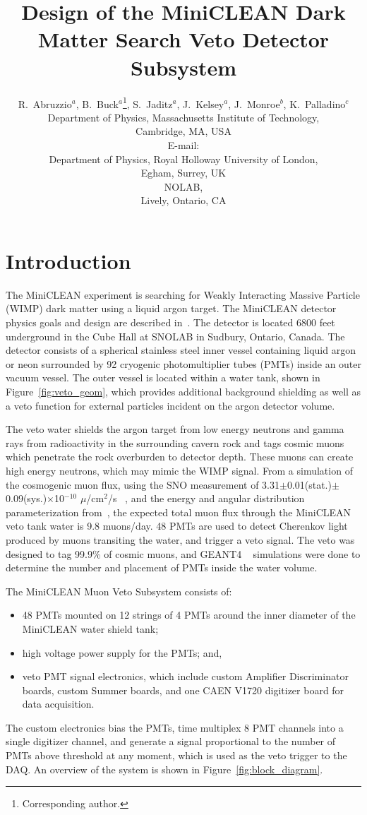 \documentclass{JINST}
\title{Design of the MiniCLEAN Dark Matter Search Veto Detector Subsystem}
\author{R.~Abruzzio$^a$, B.~Buck$^a$\thanks{Corresponding author.}, S.~Jaditz$^a$, J.~Kelsey$^a$, J.~Monroe$^{b}$, K.~Palladino$^{c}$\\
\llap{$^a$}Department of Physics, Massachusetts Institute of Technology,\\
	Cambridge, MA, USA\\
	E-mail: \email{bbuck@mit.edu}\\
\llap{$^b$}Department of Physics, Royal Holloway University of London,\\
	Egham, Surrey, UK \\
\llap{$^c$}NOLAB, \\ 
        Lively, Ontario, CA}
\begin{document}
\section{Introduction}
\label{Introduction}
The MiniCLEAN experiment is searching for Weakly Interacting Massive Particle
(WIMP) dark matter using a liquid argon target.  The MiniCLEAN detector
physics goals and design are described in~\cite{ref:miniclean_physics}.  The
detector is located 6800 feet underground in the Cube Hall at SNOLAB in
Sudbury, Ontario, Canada.  The detector consists of a spherical stainless
steel inner vessel containing liquid argon or neon surrounded by 92 cryogenic
photomultiplier tubes (PMTs) inside an outer vacuum vessel. The outer vessel
is located within a water tank, shown in Figure~\ref{fig:veto_geom}, which
provides additional background shielding as well as a veto function for
external particles incident on the argon detector volume.  

The veto water shields the argon target from low energy neutrons and gamma
rays from radioactivity in the surrounding cavern rock and tags cosmic muons
which penetrate the rock overburden to detector depth.  These muons can
create high energy neutrons, which may mimic the WIMP signal.
From a simulation of the cosmogenic muon flux, using the SNO measurement of
3.31$\pm$0.01(stat.)$\pm$0.09(sys.)$\times$10$^{-10}$ $\mu$/cm$^2$/s
~\cite{ref:sno_muon_flux}, and the energy and angular distribution
parameterization from~\cite{ref:mei_and_hime}, the expected total muon flux
through the MiniCLEAN veto tank water is 9.8 muons/day.  48 PMTs are used to
detect Cherenkov light produced by muons transiting the water, and trigger a
veto signal.  The veto was designed to tag 99.9\% of cosmic muons, and GEANT4
~\cite{ref:geant4} simulations were done to determine the number and placement
of PMTs inside the water volume.  

The MiniCLEAN Muon Veto Subsystem consists of:
\begin{itemize}
\item 48 PMTs mounted on 12 strings of 4 PMTs around the inner diameter of the MiniCLEAN water shield tank;
\item high voltage power supply for the PMTs; and,
\item veto PMT signal electronics, which include custom Amplifier Discriminator boards, custom Summer boards, and one CAEN V1720 digitizer board for data acquisition.  
\end{itemize}
The custom electronics bias the PMTs, time multiplex 8 PMT channels into a
single digitizer channel, and generate a signal proportional to the number
of PMTs above threshold at any moment, which is used as the veto trigger to
the DAQ.  An overview of the system is shown in
Figure~\ref{fig:block_diagram}.
\end{document}
